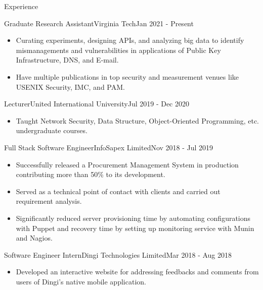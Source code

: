 \documentclass[]{mcdowellcv}
\begin{document}
	\makeheader
	
	\begin{cvsection}{Experience}
		\begin{cvsubsection}{Graduate Research Assistant}{Virginia Tech}{Jan 2021 - Present}
			\begin{itemize}
				\item Curating experiments, designing APIs, and analyzing big data to identify mismanagements and vulnerabilities in applications of Public Key Infrastructure, DNS, and E-mail.
				\item Have multiple publications in top security and measurement venues like USENIX Security, IMC, and PAM.
			\end{itemize}
		\end{cvsubsection}
		
		\begin{cvsubsection}{Lecturer}{United International University}{Jul 2019 - Dec 2020}
			\begin{itemize}
				\item Taught Network Security, Data Structure, Object-Oriented Programming, etc. undergraduate courses.
			\end{itemize}
		\end{cvsubsection}
		
		\begin{cvsubsection}{Full Stack Software Engineer}{InfoSapex Limited}{Nov 2018 - Jul 2019}
			\begin{itemize}
				\item Successfully released a Procurement Management System in production contributing more than 50\% to its development.
				\item Served as a technical point of contact with clients and carried out requirement analysis.
				\item Significantly reduced server provisioning time by automating configurations with Puppet and recovery time by setting up monitoring service with Munin and Nagios.
			\end{itemize}
		\end{cvsubsection}
		
		\begin{cvsubsection}{Software Engineer Intern}{Dingi Technologies Limited}{Mar 2018 - Aug 2018}
			\begin{itemize}
				\item Developed an interactive website for addressing feedbacks and comments from users of Dingi's native mobile application.
			\end{itemize}
		\end{cvsubsection}
	\end{cvsection}
	
\end{document}
